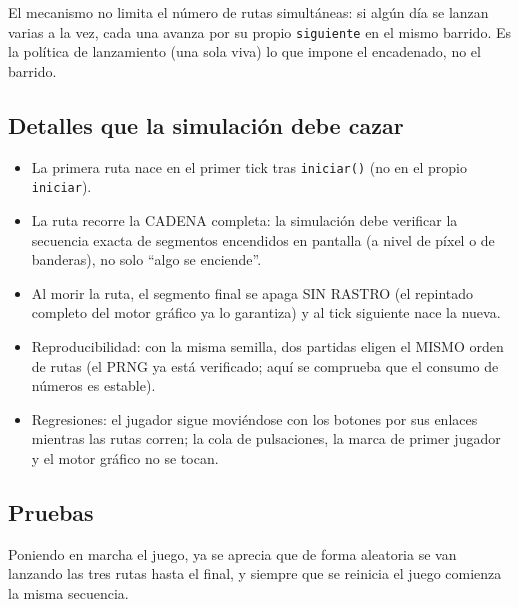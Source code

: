 	El mecanismo no limita el número de rutas simultáneas: si algún
	día se lanzan varias a la vez, cada una avanza por su propio
	\texttt{siguiente} en el mismo barrido. Es la política de
	lanzamiento (una sola viva) lo que impone el encadenado, no el
	barrido.
	
	\subsection{Detalles que la simulación debe cazar}
	
	\begin{itemize}
		\item La primera ruta nace en el primer tick tras
		\texttt{iniciar()} (no en el propio \texttt{iniciar}).
		
		\item La ruta recorre la CADENA completa: la simulación debe
		verificar la secuencia exacta de segmentos encendidos en
		pantalla (a nivel de píxel o de banderas), no solo ``algo
		se enciende''.
		
		\item Al morir la ruta, el segmento final se apaga SIN RASTRO
		(el repintado completo del motor gráfico ya lo garantiza)
		y al tick siguiente nace la nueva.
		
		\item Reproducibilidad: con la misma semilla, dos partidas
		eligen el MISMO orden de rutas (el PRNG ya está verificado;
		aquí se comprueba que el consumo de números es estable).
		
		\item Regresiones: el jugador sigue moviéndose con los botones
		por sus enlaces mientras las rutas corren; la cola de
		pulsaciones, la marca de primer jugador y el motor gráfico
		no se tocan.
	\end{itemize}
	
	\subsection{Pruebas}
	
	Poniendo en marcha el juego, ya se aprecia que de forma aleatoria se van lanzando las tres rutas hasta el final, y siempre que se reinicia el juego comienza la misma secuencia.
	
\clearpage